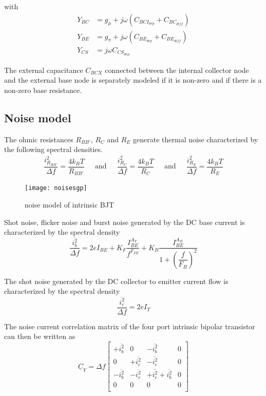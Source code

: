 \documentclass[10pt]{report}
\begin{document}
with
\begin{align}
Y_{BC} &= g_{\mu} + j\omega \left(C_{BCI_{dep}} + C_{BC_{diff}}\right)\\
Y_{BE} &= g_{\pi} + j\omega \left(C_{BE_{dep}} + C_{BE_{diff}}\right)\\
Y_{CS} &= j\omega C_{CS_{dep}}
\end{align}

The external capacitance $C_{BCX}$ connected between the internal
collector node and the external base node is separately modeled if it
is non-zero and if there is a non-zero base resistance.

\subsection{Noise model}

The ohmic resistances $R_{BB'}$, $R_C$ and $R_E$ generate thermal
noise characterized by the following spectral densities.
\begin{equation}
\dfrac{\overline{i_{R_{BB'}}^2}}{\Delta f} = \dfrac{4 k_B T}{R_{BB'}}
\;\;\;\; \textrm{ and } \;\;\;\;
\dfrac{\overline{i_{R_C}^2}}{\Delta f} = \dfrac{4 k_B T}{R_C}
\;\;\;\; \textrm{ and } \;\;\;\;
\dfrac{\overline{i_{R_E}^2}}{\Delta f} = \dfrac{4 k_B T}{R_E}
\end{equation}

\begin{figure}[ht]
\begin{center}
\texttt{[image: noisesgp]}
\end{center}
\caption{noise model of intrinsic BJT}
\label{fig:noisesgp}
\end{figure}
\FloatBarrier

Shot noise, flicker noise and burst noise generated by the DC base
current is characterized by the spectral density
\begin{equation}
\dfrac{\overline{i_{b}^2}}{\Delta f} = 2e I_{BE} + K_F\dfrac{I_{BE}^{A_F}}{f^{F_{FE}}} + K_B\dfrac{I_{BE}^{A_B}}{1 + \left(\dfrac{f}{F_B}\right)^2}
\end{equation}

The shot noise generated by the DC collector to emitter current flow
is characterized by the spectral density
\begin{equation}
\dfrac{\overline{i_{c}^2}}{\Delta f} = 2e I_{T}
\end{equation}

The noise current correlation matrix of the four port intrinsic
bipolar transistor can then be written as
\begin{equation}
\underline{C}_Y = \Delta f
\begin{bmatrix}
+\overline{i_{b}^2} & 0 & -\overline{i_{b}^2} & 0\\
0 & +\overline{i_{c}^2} & -\overline{i_{c}^2} & 0\\
-\overline{i_{b}^2} & -\overline{i_{c}^2} & +\overline{i_{c}^2} +\overline{i_{b}^2} & 0\\
0 & 0 & 0 & 0\\
\end{bmatrix}
\end{equation}
\end{document}
